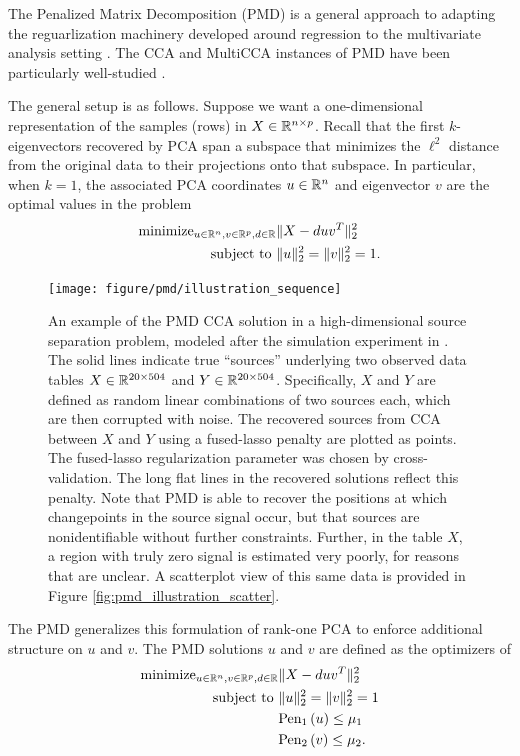 \documentclass{article}
\begin{document}
The Penalized Matrix Decomposition (PMD) is a general approach to adapting the
reguarlization machinery developed around regression to the multivariate
analysis setting \citep{witten2009penalized}. The CCA and MultiCCA instances of
PMD have been particularly well-studied \citep{witten2009penalized,
  witten2013package}.

The general setup is as follows. Suppose we want a one-dimensional
representation of the samples (rows) in $X \in \mathbb{R}^{n \times p}$. Recall that
the first $k$-eigenvectors recovered by PCA span a subspace that minimizes the
$\ell^{2}$ distance from the original data to their projections onto that
subspace. In particular, when $k = 1$, the associated PCA coordinates $u \in
\mathbb{R}^{n}$ and eigenvector $v$ are the optimal values in the problem
\begin{align*}
  \text{minimize}_{u \in \mathbb{R}^{n}, v \in \mathbb{R}^{p}, d \in \mathbb{R}} &\|X - duv^{T}\|_{2}^{2} \\
  \text{subject to } &\|u\|_{2}^{2} = \|v\|_{2}^{2} = 1.
\end{align*}

\begin{figure}
  \centering
  \texttt{[image: figure/pmd/illustration\_sequence]}
  \caption{An example of the PMD CCA solution in a high-dimensional source
    separation problem, modeled after the simulation experiment in
    \citep{witten2009penalized}. The solid lines indicate true ``sources''
    underlying two observed data tables $X \in \mathbb{R}^{20 \times 504}$ and $Y
    \in \mathbb{R}^{20 \times 504}$. Specifically, $X$ and $Y$ are defined as random
    linear combinations of two sources each, which are then corrupted with
    noise. The recovered sources from CCA between $X$ and $Y$ using a
    fused-lasso penalty are plotted as points. The fused-lasso regularization
    parameter was chosen by cross-validation. The long flat lines in the
    recovered solutions reflect this penalty. Note that PMD is able to recover
    the positions at which changepoints in the source signal occur, but that
    sources are nonidentifiable without further constraints. Further, in the
    table $X$, a region with truly zero signal is estimated very poorly, for
    reasons that are unclear. A scatterplot view of this same data is provided
    in Figure
    \ref{fig:pmd_illustration_scatter}. \label{fig:pmd_illustration_sequence}}
\end{figure}

The PMD generalizes this formulation of rank-one PCA to enforce additional
structure on $u$ and $v$. The PMD solutions $u$ and $v$ are defined as the
optimizers of
\begin{align}
\label{eq:pmd_opt} \text{minimize}_{u \in \mathbb{R}^{n}, v \in \mathbb{R}^{p}, d
  \in \mathbb{R}} &\|X - duv^{T}\|_{2}^{2} \\
  \text{subject to } &\|u\|_{2}^{2} = \|v\|_{2}^{2} = 1 \nonumber \\ 
  & \text{Pen}_{1}\left(u\right) \leq \mu_{1} \nonumber \\
  & \text{Pen}_{2}\left(v\right) \leq \mu_{2}. \nonumber
\end{align}
\end{document}
